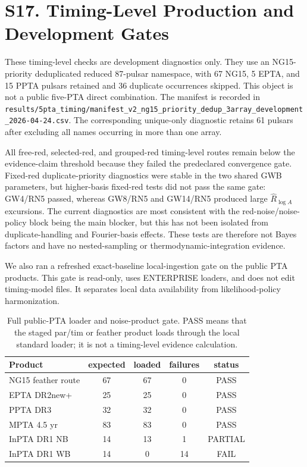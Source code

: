 \documentclass[aps,prl,superscriptaddress,nofootinbib]{revtex4-2}
\begin{document}
\section*{S17. Timing-Level Production and Development Gates}

These timing-level checks are development diagnostics only.  They use an
NG15-priority deduplicated reduced 87-pulsar namespace, with 67 NG15,
5 EPTA, and 15 PPTA pulsars retained and 36 duplicate occurrences skipped.
This object is not a public five-PTA direct combination.  The manifest is
recorded in \nolinkurl{results/5pta_timing/manifest_v2_ng15_priority_dedup_3array_development_2026-04-24.csv}.
The corresponding unique-only diagnostic retains 61 pulsars after excluding
all names occurring in more than one array.

All free-red, selected-red, and grouped-red timing-level routes remain below
the evidence-claim threshold because they failed the predeclared convergence
gate.  Fixed-red duplicate-priority diagnostics were stable in the two shared
GWB parameters, but higher-basis fixed-red tests did not pass the same gate:
GW4/RN5 passed, whereas GW8/RN5 and GW14/RN5 produced large
$\hat R_{\log A}$ excursions.  The current diagnostics are most consistent
with the red-noise/noise-policy block being the main blocker, but this has not
been isolated from duplicate-handling and Fourier-basis effects.  These tests
are therefore not Bayes factors and have no nested-sampling or
thermodynamic-integration evidence.

We also ran a refreshed exact-baseline local-ingestion gate on the public PTA
products.  This gate is read-only, uses ENTERPRISE loaders, and does not edit
timing-model files.  It separates local data availability from likelihood-policy
harmonization.

\begin{table}[H]
\caption{\label{tab:full-loader}Full public-PTA loader and noise-product gate.
PASS means that the staged par/tim or feather product loads through the local
standard loader; it is not a timing-level evidence calculation.}
\begin{ruledtabular}
\begin{tabular}{lcccc}
Product & expected & loaded & failures & status \\
\hline
NG15 feather route & 67 & 67 & 0 & PASS \\
EPTA DR2new+ & 25 & 25 & 0 & PASS \\
PPTA DR3 & 32 & 32 & 0 & PASS \\
MPTA 4.5 yr & 83 & 83 & 0 & PASS \\
InPTA DR1 NB & 14 & 13 & 1 & PARTIAL \\
InPTA DR1 WB & 14 & 0 & 14 & FAIL \\
\end{tabular}
\end{ruledtabular}
\end{table}
\end{document}
